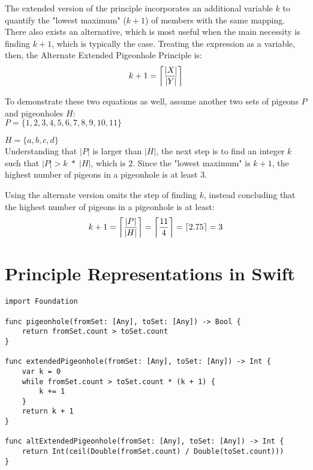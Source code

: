 \documentclass{article}
\DeclarePairedDelimiter{\ceil}{\lceil}{\rceil}
\begin{document}
The extended version of the principle incorporates an additional variable $k$ to quantify the "lowest maximum" ($k+1$) of members with the same mapping. There also exists an alternative, which is most useful when the main necessity is finding $k+1$, which is typically the case. Treating the expression as a variable, then, the Alternate Extended Pigeonhole Principle is:
\begin{equation}
  k+1 = \ceil*{\frac{|X|}{|Y|}}
\end{equation}

To demonstrate these two equations as well, assume another two sets of pigeons $P$ and pigeonholes $H$:\\

$P=\{1, 2, 3, 4, 5, 6, 7, 8, 9, 10, 11\}$

$H=\{a, b, c, d\}$\\

Understanding that $|P|$ is larger than $|H|$, the next step is to find an integer $k$ such that $|P| > k \; * \; |H|$, which is $2$. Since the "lowest maximum" is $k+1$, the highest number of pigeons in a pigeonhole is at least $3$.

Using the alternate version omits the step of finding $k$, instead concluding that the highest number of pigeons in a pigeonhole is at least:
\[k+1=\ceil*{\frac{|P|}{|H|}}=\ceil*{\frac{11}{4}}=\ceil*{2.75}=3\]

\section{Principle Representations in Swift}

\begin{verbatim}
import Foundation

func pigeonhole(fromSet: [Any], toSet: [Any]) -> Bool {
    return fromSet.count > toSet.count
}

func extendedPigeonhole(fromSet: [Any], toSet: [Any]) -> Int {
    var k = 0
    while fromSet.count > toSet.count * (k + 1) {
        k += 1
    }
    return k + 1
}

func altExtendedPigeonhole(fromSet: [Any], toSet: [Any]) -> Int {
    return Int(ceil(Double(fromSet.count) / Double(toSet.count)))
}
\end{verbatim}
\end{document}
